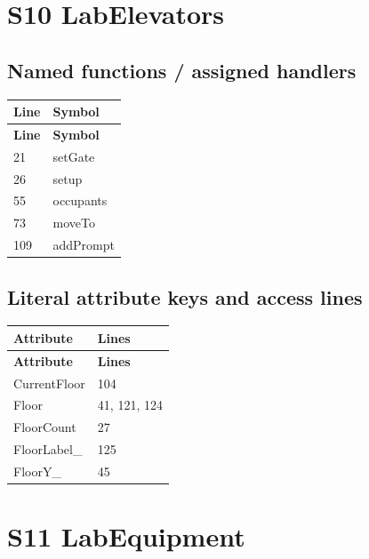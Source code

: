 \section{S10 LabElevators}
\subsection{Named functions /\allowbreak{} assigned handlers}
\begin{longtable}{p{}p{}}
\toprule
\textbf{Line} & \textbf{Symbol} \\ \midrule
\endfirsthead
\textbf{Line} & \textbf{Symbol} \\ \midrule
\endhead
21 & setGate \\
26 & setup \\
55 & occupants \\
73 & moveTo \\
109 & addPrompt \\
\bottomrule
\end{longtable}
\subsection{Literal attribute keys and access lines}
\begin{longtable}{p{}p{}}
\toprule
\textbf{Attribute} & \textbf{Lines} \\ \midrule
\endfirsthead
\textbf{Attribute} & \textbf{Lines} \\ \midrule
\endhead
CurrentFloor & 104 \\
Floor & 41, 121, 124 \\
FloorCount & 27 \\
FloorLabel\_\allowbreak{} & 125 \\
FloorY\_\allowbreak{} & 45 \\
\bottomrule
\end{longtable}
\section{S11 LabEquipment}
